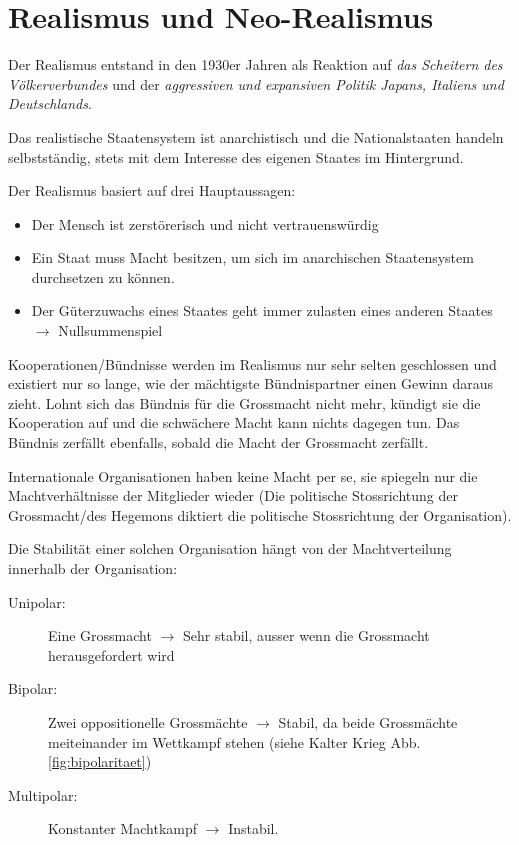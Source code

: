 \documentclass[a4paper, 11pt]{article}
\begin{document}
\newpage

\section{Realismus und Neo-Realismus}

Der Realismus entstand in den 1930er Jahren als Reaktion auf \textit{das Scheitern des Völkerverbundes} und der \textit{aggressiven und expansiven Politik Japans, Italiens und Deutschlands}.

\vspace{10px}

\noindent Das realistische Staatensystem ist anarchistisch und die Nationalstaaten handeln selbstständig, stets mit dem Interesse des eigenen Staates im Hintergrund.

\vspace{10px}

\noindent Der Realismus basiert auf drei Hauptaussagen:

\begin{itemize}
	\item Der Mensch ist zerstörerisch und nicht vertrauenswürdig
	\item Ein Staat muss Macht besitzen, um sich im anarchischen Staatensystem durchsetzen zu können.
	\item Der Güterzuwachs eines Staates geht immer zulasten eines anderen Staates $\rightarrow$ Nullsummenspiel
\end{itemize}

Kooperationen/Bündnisse werden im Realismus nur sehr selten geschlossen und existiert nur so lange, wie der mächtigste Bündnispartner einen Gewinn daraus zieht. Lohnt sich das Bündnis für die Grossmacht nicht mehr, kündigt sie die Kooperation auf und die schwächere Macht kann nichts dagegen tun. Das Bündnis zerfällt ebenfalls, sobald die Macht der Grossmacht zerfällt.

Internationale Organisationen haben keine Macht per se, sie spiegeln nur die Machtverhältnisse der Mitglieder wieder (Die politische Stossrichtung der Grossmacht/des Hegemons diktiert die politische Stossrichtung der Organisation). 

\vspace{10px}

\noindent Die Stabilität einer solchen Organisation hängt von der Machtverteilung innerhalb der Organisation:

\begin{description}
	\item[Unipolar: ] Eine Grossmacht $\rightarrow$ Sehr stabil, ausser wenn die Grossmacht herausgefordert wird
    \item[Bipolar: ] Zwei oppositionelle Grossmächte $\rightarrow$ Stabil, da beide Grossmächte meiteinander im Wettkampf stehen (siehe Kalter Krieg Abb.  \ref{fig:bipolaritaet})
	\item[Multipolar: ] Konstanter Machtkampf $\rightarrow$ Instabil.
\end{description}
\end{document}
